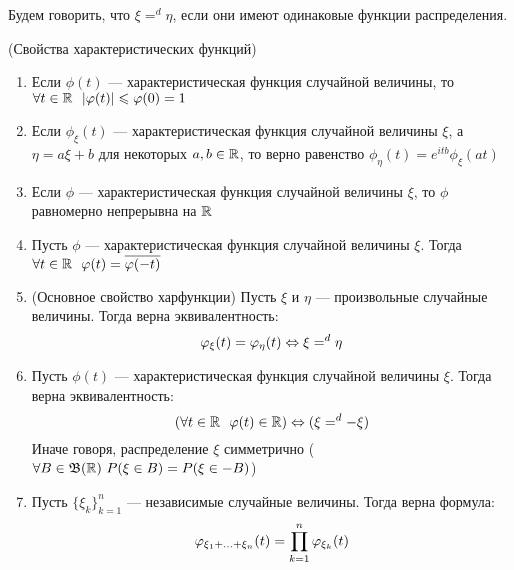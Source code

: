 \begin{designation}
	Будем говорить, что $\xi =^d \eta$, если они имеют одинаковые функции распределения.
\end{designation}

\begin{lemma} (Свойства характеристических функций)
	\begin{enumerate}
		\item Если $\phi(t)$ --- характеристическая функция случайной величины, то \(\forall t \in \mathbb{R}\ \ |\varphi(t)| \leqslant \varphi(0) = 1\)
		
		\item Если $\phi_\xi(t)$ --- характеристическая функция случайной величины $\xi$, а $\eta = a\xi + b$ для некоторых $a, b \in \mathbb{R}$, то верно равенство \(\phi_\eta(t) = e^{itb}\phi_\xi(at)\)
		
		\item Если $\phi$ --- характеристическая функция случайной величины $\xi$, то $\phi$ равномерно непрерывна на $\mathbb{R}$
		
		\item Пусть $\phi$ --- характеристическая функция случайной величины $\xi$. Тогда \(\forall t \in \mathbb{R}\ \ \varphi(t) = \overline{\varphi(-t)}\)
		
		\item (Основное свойство харфункции) Пусть $\xi$ и $\eta$ --- произвольные случайные величины. Тогда верна эквивалентность:
		\[
			\varphi_\xi(t) = \varphi_\eta(t) \Leftrightarrow \xi =^d \eta
		\]
		
		\item Пусть $\phi(t)$ --- характеристическая функция случайной величины $\xi$. Тогда верна эквивалентность:
		\[
			(\forall t \in \mathbb{R}\ \ \varphi(t) \in \mathbb{R}) \Leftrightarrow (\xi =^d -\xi)
		\]
		Иначе говоря, распределение $\xi$ симметрично ($\forall B \in \mathfrak{B}(\mathbb{R})\ P(\xi \in B) = P(\xi \in -B)$)
		
		\item Пусть $\{\xi_k\}_{k = 1}^n$ --- независимые случайные величины. Тогда верна формула:
		\[
			\varphi_{\xi_1 + \ldots + \xi_n}(t) = \prod_{k = 1}^n \varphi_{\xi_k}(t)
		\]
	\end{enumerate}
\end{lemma}

